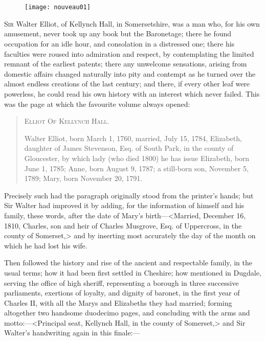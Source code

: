 \chapter[Chapter \thechapter]{}

\begin{figure}[t!]
\centering
\texttt{[image: nouveau01]}
\end{figure}

\lettrine[lraise=0.3]{S}{ir} Walter Elliot, of Kellynch Hall, in Somersetshire, was a man who, for his own amusement, never took up any book but the Baronetage; there he found occupation for an idle hour, and consolation in a distressed one; there his faculties were roused into admiration and respect, by contemplating the limited remnant of the earliest patents; there any unwelcome sensations, arising from domestic affairs changed naturally into pity and contempt as he turned over the almost endless creations of the last century; and there, if every other leaf were powerless, he could read his own history with an interest which never failed. This was the page at which the favourite volume always opened:

\begin{quote}
	\begin{center}\scshape
Elliot Of Kellynch Hall.
\end{center}

Walter Elliot, born March 1, 1760, married, July 15, 1784, Elizabeth, daughter of James Stevenson, Esq. of South Park, in the county of Gloucester, by which lady (who died 1800) he has issue Elizabeth, born June 1, 1785; Anne, born August 9, 1787; a still-born son, November 5, 1789; Mary, born November 20, 1791.
\end{quote}

Precisely such had the paragraph originally stood from the printer's hands; but Sir Walter had improved it by adding, for the information of himself and his family, these words, after the date of Mary's birth—<Married, December 16, 1810, Charles, son and heir of Charles Musgrove, Esq. of Uppercross, in the county of Somerset,> and by inserting most accurately the day of the month on which he had lost his wife.

Then followed the history and rise of the ancient and respectable family, in the usual terms; how it had been first settled in Cheshire; how mentioned in Dugdale, serving the office of high sheriff, representing a borough in three successive parliaments, exertions of loyalty, and dignity of baronet, in the first year of Charles II, with all the Marys and Elizabeths they had married; forming altogether two handsome duodecimo pages, and concluding with the arms and motto:—<Principal seat, Kellynch Hall, in the county of Somerset,> and Sir Walter's handwriting again in this finale:—

